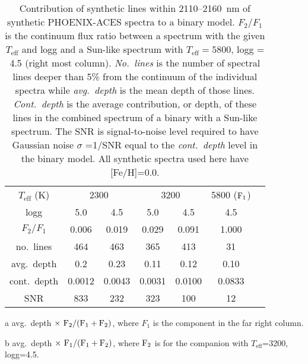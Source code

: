 
\begin{table}
        \small
    \begin{threeparttable}[b]

   \caption{Contribution of synthetic lines within 2110--2160~nm of synthetic PHOENIX-ACES spectra to a binary model. \(F_{2}/F_{1}\) is the continuum flux ratio between a spectrum with the given \(T_{\textrm{eff}}\) and logg and a Sun-like spectrum with \(T_{\textrm{eff}}=5800\), logg = 4.5 (right most column). \emph{No.\ lines} is the number of spectral lines deeper than 5\% from the continuum of the individual spectra while \emph{avg.\ depth} is the mean depth of those lines. \emph{Cont.\ depth} is the average contribution, or depth, of these lines in the combined spectrum of a binary with a Sun-like spectrum. The SNR is signal-to-noise level required to have Gaussian noise \(\sigma\) =1/SNR equal to the \emph{cont.\ depth} level in the binary model. All synthetic spectra used here have [Fe/H]=0.0.}
    
    \begin{tabular}{*7c}
        \toprule
        \(T_{\textrm{eff}}\) (K)  & \multicolumn{2}{c}{2300} & \multicolumn{2}{c}{3200} & 5800 (\(\rm F_1\))\\
        logg & 5.0 & 4.5  & 5.0 & 4.5 & 4.5 \\
        \midrule
        \(F_2/F_1\) & 0.006 & 0.019 & 0.029  & 0.091 & 1.000 \\  
        no.\ lines & 464 & 463 & 365  & 413 & 31 \\
        avg.\ depth & 0.2  & 0.23& 0.11 & 0.12 & 0.10 \\
        cont.\ depth\tnote{a} &  0.0012 & 0.0043 &  0.0031 & 0.0100&  0.0833\tnote{b} \\ 
        SNR  & 833 & 232 & 323  & 100 & 12 \\ 
        \bottomrule
    \end{tabular}
    \begin{tablenotes}
        \item [a] avg.\ depth \(\times~ \rm F_2 / (F_1 + F_2)\), where \(F_1\) is the component in the far right column.
        \item[b] avg.\ depth \(\times~ \rm F_1 / (F_1 + F_2)\), where \(\rm F_2\) is for the companion with \(T_{\textrm{eff}}\)=3200, logg=4.5.
    \end{tablenotes}
    \end{threeparttable}
    \label{tab:line_contributions}
\end{table}